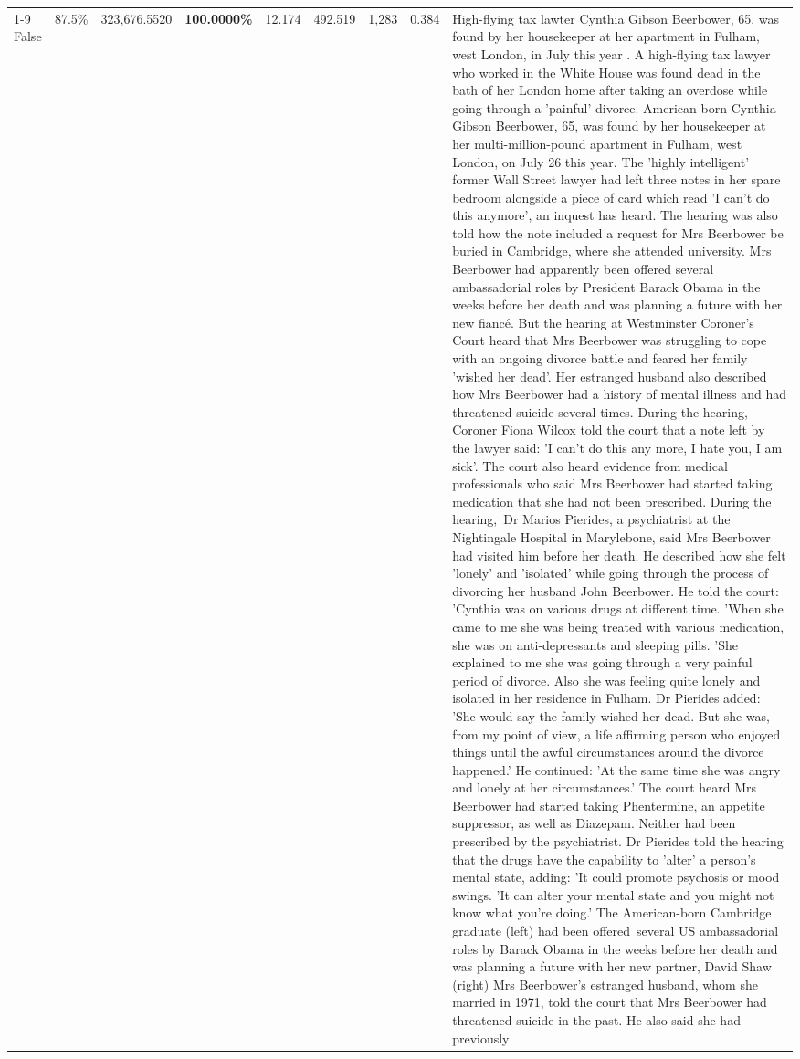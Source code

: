\begin{table}[H]
\begin{tabular}{lllrlllll}
\cline{1-9}
False & 87.5\% & 323,676.5520 & \bfseries \color{red} 100.0000\% & 12.174 & 492.519 & 1,283 & 0.384 & High-flying tax lawter Cynthia Gibson Beerbower, 65, was found by her housekeeper at her apartment in Fulham, west London, in July this year . A high-flying tax lawyer who worked in the White House was found dead in the bath of her London home after taking an overdose while going through a 'painful' divorce. American-born Cynthia Gibson Beerbower, 65, was found by her housekeeper at her multi-million-pound apartment in Fulham, west London, on July 26 this year. The 'highly intelligent' former Wall Street lawyer had left three notes in her spare bedroom alongside a piece of card which read 'I can't do this anymore', an inquest has heard. The hearing was also told how the note included a request for Mrs Beerbower be buried in Cambridge, where she attended university. Mrs Beerbower had apparently been offered several ambassadorial roles by President Barack Obama in the weeks before her death and was planning a future with her new fiancé. But the hearing at Westminster Coroner's Court heard that Mrs Beerbower was struggling to cope with an ongoing divorce battle and feared her family 'wished her dead'. Her estranged husband also described how Mrs Beerbower had a history of mental illness and had threatened suicide several times. During the hearing, Coroner Fiona Wilcox told the court that a note left by the lawyer said: 'I can't do this any more, I hate you, I am sick'. The court also heard evidence from medical professionals who said Mrs Beerbower had started taking medication that she had not been prescribed. During the hearing, Dr Marios Pierides, a psychiatrist at the Nightingale Hospital in Marylebone, said Mrs Beerbower had visited him before her death. He described how she felt 'lonely' and 'isolated' while going through the process of divorcing her husband John Beerbower. He told the court: 'Cynthia was on various drugs at different time. 'When she came to me she was being treated with various medication, she was on anti-depressants and sleeping pills. 'She explained to me she was going through a very painful period of divorce. Also she was feeling quite lonely and isolated in her residence in Fulham. Dr Pierides added: 'She would say the family wished her dead. But she was, from my point of view, a life affirming person who enjoyed things until the awful circumstances around the divorce happened.' He continued: 'At the same time she was angry and lonely at her circumstances.' The court heard Mrs Beerbower had started taking Phentermine, an appetite suppressor, as well as Diazepam. Neither had been prescribed by the psychiatrist. Dr Pierides told the hearing that the drugs have the capability to 'alter' a person's mental state, adding: 'It could promote psychosis or mood swings. 'It can alter your mental state and you might not know what you're doing.' The American-born Cambridge graduate (left) had been offered several US ambassadorial roles by Barack Obama in the weeks before her death and was planning a future with her new partner, David Shaw (right) Mrs Beerbower's estranged husband, whom she married in 1971, told the court that Mrs Beerbower had threatened suicide in the past. He also said she had previously 
\end{tabular}
\end{table}
